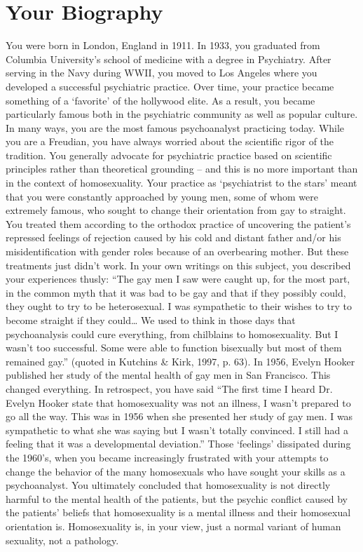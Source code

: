 \section{Your Biography}
\label{yourbiography}

You were born in London, England in 1911. In 1933, you graduated from Columbia University's school of medicine with a degree in Psychiatry. After serving in the Navy during WWII, you moved to Los Angeles where you developed a successful psychiatric practice. Over time, your practice became something of a `favorite' of the hollywood elite. As a result, you became particularly famous both in the psychiatric community as well as popular culture. In many ways, you are the most famous psychoanalyst practicing today.
While you are a Freudian, you have always worried about the scientific rigor of the tradition. You generally advocate for psychiatric practice based on scientific principles rather than theoretical grounding – and this is no more important than in the context of homosexuality.
Your practice as `psychiatrist to the stars' meant that you were constantly approached by young men, some of whom were extremely famous, who sought to change their orientation from gay to straight. You treated them according to the orthodox practice of uncovering the patient's repressed feelings of rejection caused by his cold and distant father and\slash or his misidentification with gender roles because of an overbearing mother. But these treatments just didn't work. In your own writings on this subject, you described your experiences thusly: “The gay men I saw were caught up, for the most part, in the common myth that it was bad to be gay and that if they possibly could, they ought to try to be heterosexual. I was sympathetic to their wishes to try to become straight if they could{\ldots} We used to think in those days that psychoanalysis could cure everything, from chilblains to homosexuality. But I wasn't too successful. Some were able to function bisexually but most of them remained gay.” (quoted in Kutchins \& Kirk, 1997, p. 63).
In 1956, Evelyn Hooker published her study of the mental health of gay men in San Francisco. This changed everything. In retrospect, you have said “The first time I heard Dr. Evelyn Hooker state that homosexuality was not an illness, I wasn't prepared to go all the way. This was in 1956 when she presented her study of gay men. I was sympathetic to what she was saying but I wasn't totally convinced. I still had a feeling that it was a developmental deviation.”
Those `feelings' dissipated during the 1960's, when you became increasingly frustrated with your attempts to change the behavior of the many homosexuals who have sought your skills as a psychoanalyst. You ultimately concluded that homosexuality is not directly harmful to the mental health of the patients, but the psychic conflict caused by the patients' beliefs that homosexuality is a mental illness and their homosexual orientation is. Homosexuality is, in your view, just a normal variant of human sexuality, not a pathology.
